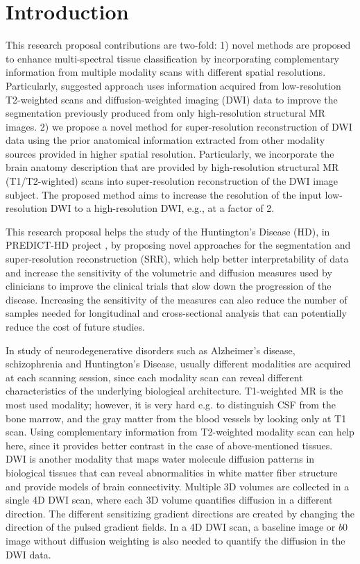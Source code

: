 
\section{Introduction}
\label{section:Introduction}

This research proposal contributions are two-fold:
1) novel methods are proposed to enhance multi-spectral tissue classification by incorporating complementary information from multiple modality scans with different spatial resolutions.
Particularly, suggested approach uses information acquired from low-resolution T2-weighted scans and diffusion-weighted imaging (DWI) data to improve the segmentation previously produced from only high-resolution structural MR images.
2) we propose a novel method for super-resolution reconstruction of DWI data using the prior anatomical information extracted from other modality sources provided in higher spatial resolution.  Particularly, we incorporate the brain anatomy description that are provided by high-resolution structural MR (T1/T2-wighted) scans into super-resolution reconstruction of the DWI image subject. The proposed method aims to increase the resolution of the input low-resolution DWI to a high-resolution DWI, e.g., at a factor of 2.

This research proposal helps the study of the Huntington's Disease (HD), in PREDICT-HD project \cite{PREDICTHD}, by proposing novel approaches for the segmentation and super-resolution reconstruction (SRR), which help better interpretability of data and increase the sensitivity of the volumetric and diffusion measures used by clinicians to improve the clinical trials that slow down the progression of the disease. Increasing the sensitivity of the measures can also reduce the number of samples needed for longitudinal and cross-sectional analysis that can potentially reduce the cost of future studies. 

In study of neurodegenerative disorders such as Alzheimer's disease, schizophrenia and Huntington's Disease, usually different modalities are acquired at each scanning session, since each modality scan can reveal different characteristics of the underlying biological architecture. T1-weighted MR is the most used modality; however, it is very hard e.g. to distinguish CSF from the bone marrow, and the gray matter from the blood vessels by looking only at T1 scan. Using complementary information from T2-weighted modality scan can help here, since it provides better contrast in the case of above-mentioned tissues.
DWI is another modality that maps water molecule diffusion patterns in biological tissues that can reveal abnormalities in white matter fiber structure and provide models of brain connectivity. Multiple 3D volumes are collected in a single 4D DWI scan, where each 3D volume quantifies diffusion in a different direction. The different sensitizing gradient directions are created by changing the direction of the pulsed gradient fields. In a 4D DWI scan, a baseline image or $b0$ image without diffusion weighting is also needed to quantify the diffusion in the DWI data. 

